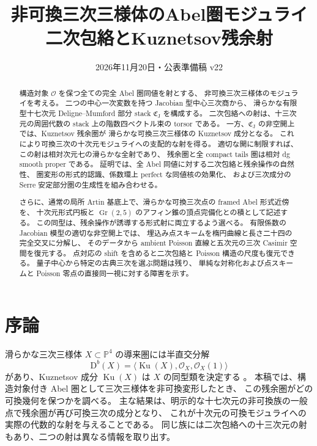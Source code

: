\documentclass[11pt,a4paper]{ltjsarticle}
\title{非可換三次三様体のAbel圏モジュライ\\二次包絡とKuznetsov残余射}
\author{}
\date{2026年11月20日・公表準備稿 v22}
\numberwithin{equation}{section}
\newcommand{\PP}{\mathbb P}
\begin{document}
\maketitle
\begin{abstract}
構造対象 $\mathcal O$ を保つ全ての完全 Abel 圏同値を射とする、
非可換三次三様体のモジュライを考える。
二つの中心一次変数を持つ Jacobian 型中心三次商から、
滑らかな有限型十七次元 Deligne--Mumford 部分 stack $\mathfrak C_{\mathrm J}$ を構成する。
二次包絡への射は、十三次元の周囲代数の stack 上の階数四ベクトル束の torsor である。
一方、$\mathfrak C_{\mathrm J}$ の非空開上では、Kuznetsov 残余圏が
滑らかな可換三次三様体の Kuznetsov 成分となる。
これにより可換三次の十次元モジュライへの支配的な射を得る。
適切な開に制限すれば、この射は相対次元七の滑らかな全射であり、
残余圏と全 compact tails 圏は相対 dg smooth proper である。
証明では、全 Abel 同値に対する二次包絡と残余操作の自然性、
圏変形の形式的認識、係数環上 perfect な同値核の効果化、
および三次成分の Serre 安定部分圏の生成性を組み合わせる。

さらに、通常の局所 Artin 基底上で、滑らかな可換三次点の framed Abel 形式近傍を、
十次元形式円板と $\operatorname{Gr}(2,5)$ のアフィン錐の頂点完備化との積として記述する。
この同型は、残余操作が誘導する形式射に両立するよう選べる。
有限係数の Jacobian 模型の適切な非空開上では、
埋込み点スキームを楕円曲線と長さ二十四の完全交叉に分解し、
そのデータから ambient Poisson 直線と五次元の三次 Casimir 空間を復元する。
点対応の shift を含めると二次包絡と Poisson 構造の尺度も復元できる。
量子中心から特定の古典三次を選ぶ問題は残り、
単純な対称化および点スキームと Poisson 零点の直接同一視に対する障害を示す。
\end{abstract}

\setcounter{tocdepth}{1}
\tableofcontents

\section{序論}\label{sec:intro}

滑らかな三次三様体 $X\subset\PP^4$ の導来圏には半直交分解
\[
 \mathrm D^b(X)=\langle\operatorname{Ku}(X),\mathcal O_X,\mathcal O_X(1)\rangle
\]
があり、Kuznetsov 成分 $\operatorname{Ku}(X)$ は $X$ の同型類を決定する
\cite[Theorem~1.1]{BMMSCubicTorelli}。
本稿では、構造対象付き Abel 圏として三次三様体を非可換変形したとき、
この残余圏がどの可換幾何を保つかを調べる。
主な結果は、明示的な十七次元の非可換族の一般点で残余圏が再び可換三次の成分となり、
これが十次元の可換モジュライへの実際の代数的な射を与えることである。
同じ族には二次包絡への十三次元の射もあり、二つの射は異なる情報を取り出す。
\end{document}
